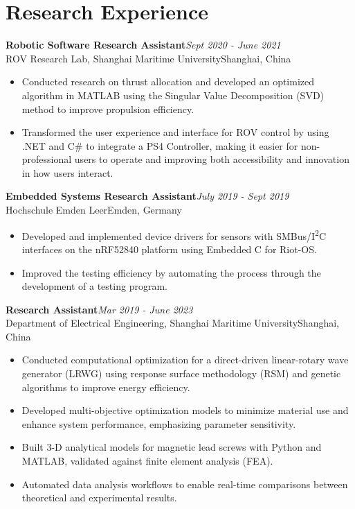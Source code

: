 \documentclass[letterpaper,10pt]{article}
\newcommand{\entry}[4]{%
  \textbf{#1}\hfill\textit{#2}\\
  #3\hfill #4\par}
\begin{document}
\section{Research Experience}

\entry{Robotic Software Research Assistant}{Sept 2020 - June 2021}
  {ROV Research Lab, Shanghai Maritime University}{Shanghai, China}
\begin{itemize}
  \item Conducted research on thrust allocation and developed an optimized algorithm in MATLAB using the Singular Value Decomposition (SVD) method to improve propulsion efficiency.
  \item Transformed the user experience and interface for ROV control by using .NET and C\# to integrate a PS4 Controller, making it easier for non-professional users to operate and improving both accessibility and innovation in how users interact.
\end{itemize}

\entry{Embedded Systems Research Assistant}{July 2019 - Sept 2019}
  {Hochschule Emden Leer}{Emden, Germany}
\begin{itemize}
  \item Developed and implemented device drivers for sensors with SMBus/I\textsuperscript{2}C interfaces on the nRF52840 platform using Embedded C for Riot-OS.
  \item Improved the testing efficiency by automating the process through the development of a testing program.
\end{itemize}

\entry{Research Assistant}{Mar 2019 - June 2023}
  {Department of Electrical Engineering, Shanghai Maritime University}{Shanghai, China}
\begin{itemize}
  \item Conducted computational optimization for a direct-driven linear-rotary wave generator (LRWG) using response surface methodology (RSM) and genetic algorithms to improve energy efficiency.
  \item Developed multi-objective optimization models to minimize material use and enhance system performance, emphasizing parameter sensitivity.
  \item Built 3-D analytical models for magnetic lead screws with Python and MATLAB, validated against finite element analysis (FEA).
  \item Automated data analysis workflows to enable real-time comparisons between theoretical and experimental results.
\end{itemize}
\end{document}
